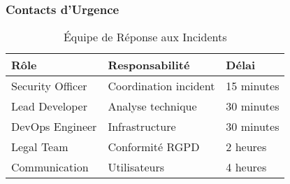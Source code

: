 \subsubsection{Contacts d'Urgence}

\begin{table}[H]
\centering
\begin{tabular}{|l|l|l|}
\hline
\textbf{Rôle} & \textbf{Responsabilité} & \textbf{Délai} \\
\hline
Security Officer & Coordination incident & 15 minutes \\
Lead Developer & Analyse technique & 30 minutes \\
DevOps Engineer & Infrastructure & 30 minutes \\
Legal Team & Conformité RGPD & 2 heures \\
Communication & Utilisateurs & 4 heures \\
\hline
\end{tabular}
\caption{Équipe de Réponse aux Incidents}
\end{table}